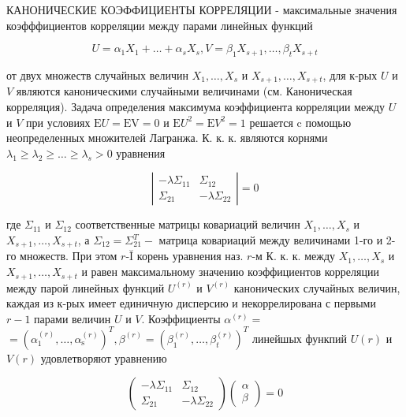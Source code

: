 \documentclass[10pt]{article}
\begin{document}
КАНОНИЧЕСКИЕ КОЭФФИЦИЕНТЫ КОРРЕЛЯЦИИ - максимальные значения коэфффициентов корреляции между парами линейных функций



\[

U=\alpha_{1} X_{1}+\ldots+\alpha_{s} X_{s}, V=\beta_{1} X_{s+1}, \ldots, \beta_{t} X_{s+t}

\]



от двух множеств случайных величин $X_{1}, \ldots, X_{s}$ и $X_{s+1}, \ldots, X_{s+t}$, для к-рых $U$ и $V$ являются каноническими случайными величинами (см. Каноническая корреляция). Задача определения максимума коэффициента корреляции между $U$ и $V$ при условиях $\mathrm{E} U=\mathrm{EV}=0$ и $\mathrm{E} U^{2}=\mathrm{E} V^{2}=1$ решается $\mathrm{c}$ помощью неопределенных множителей Лагранжа. К. к. к. являются корнями $\lambda_{1} \geqslant \lambda_{2} \geqslant \ldots \geqslant \lambda_{s}>0$ уравнения



\[

\left|\begin{array}{rr}

-\lambda \Sigma_{11} & \Sigma_{12} \\

\Sigma_{21} & -\lambda \Sigma_{22}

\end{array}\right|=0

\]



где $\Sigma_{11}$ и $\Sigma_{12}$ соответственные матрицы ковариаций величин $X_{1}, \ldots, X_{s}$ и $X_{s+1}, \ldots, X_{s+t}$, а $\Sigma_{12}=\Sigma_{21}^{T}-$ матрица ковариаций между величинами 1-го и 2-го множеств. При этом $r$-Ĭ корень уравнения наз. $r$-м К. к. к. между $X_{1}, \ldots, X_{s}$ и $X_{s+1}, \ldots, X_{s+t}$ и равен максимальному значению коэффициентов корреляции между парой линейных функций $U^{(r)}$ и $V^{(r)}$ канонических случайных величин, каждая из к-рых имеет единичную дисперсию и некоррелирована с первыми $r-1$ парами величин $U$ и $V$. Коэффициенты $\alpha^{(r)}=$ $=\left(\alpha_{1}^{(r)}, \ldots, \alpha_{\mathrm{s}}^{(r)}\right)^{T}, \beta^{(r)}=\left(\beta_{1}^{(r)}, \ldots, \beta_{t}^{(r)}\right)^{T}$ линейшых функпий $U(r)$ и $V(r)$ удовлетворяют уравнению



\[

\left(\begin{array}{rr}

-\lambda \Sigma_{11} & \Sigma_{12} \\

\Sigma_{21} & -\lambda \Sigma_{22}

\end{array}\right)\left(\begin{array}{l}

\alpha \\

\beta

\end{array}\right)=0

\]
\end{document}
